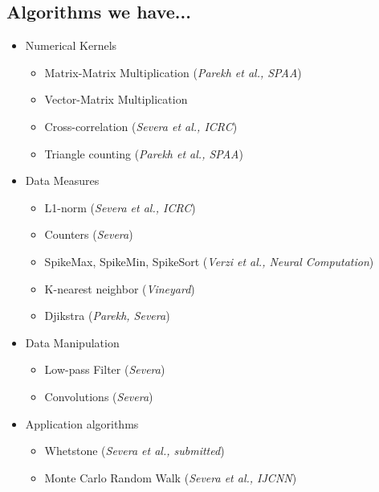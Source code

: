 \documentclass{article}
\begin{document}
\subsection{Algorithms we have...}
\begin{itemize}
	\item Numerical Kernels
	\begin{itemize}
		\item Matrix-Matrix Multiplication  (\textit{Parekh et al., SPAA})
		\item Vector-Matrix Multiplication
		\item Cross-correlation (\textit{Severa et al., ICRC})
		\item Triangle counting (\textit{Parekh et al., SPAA})
	\end{itemize}
	\item Data Measures
	\begin{itemize}
		\item L1-norm (\textit{Severa et al., ICRC})
		\item Counters (\textit{Severa})
		\item SpikeMax, SpikeMin, SpikeSort (\textit{Verzi et al., Neural Computation})
		\item K-nearest neighbor (\textit{Vineyard})
		\item Djikstra (\textit{Parekh, Severa})
	\end{itemize}
	\item Data Manipulation
	\begin{itemize}
		\item Low-pass Filter (\textit{Severa})
		\item Convolutions (\textit{Severa})
	\end{itemize}
	\item Application algorithms
	\begin{itemize}
		\item Whetstone (\textit{Severa et al., submitted})
		\item Monte Carlo Random Walk (\textit{Severa et al., IJCNN})
	\end{itemize}

\end{itemize}
\end{document}
